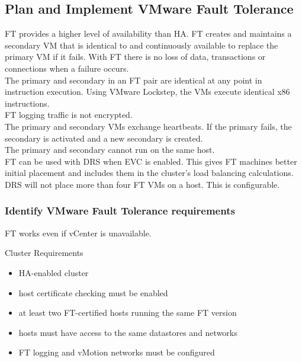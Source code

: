 \subsection{Plan and Implement VMware Fault Tolerance}

FT provides a higher level of availability than HA. FT creates and maintains
a secondary VM that is identical to and continuously available to replace
the primary VM if it fails. With FT there is no loss of data, transactions or
connections when a failure occurs.\\

The primary and secondary in an FT pair are identical at any point in
instruction execution. Using VMware Lockstep, the VMs execute identical x86
instructions.\\

FT logging traffic is not encrypted.\\

The primary and secondary VMs exchange heartbeats. If the primary fails,
the secondary is activated and a new secondary is created.\\

The primary and secondary cannot run on the same host.\\

FT can be used with DRS when EVC is enabled. This gives FT machines better
initial placement and includes them in the cluster's load balancing
calculations.\\

DRS will not place more than four FT VMs on a host. This is configurable.\\

\subsubsection{Identify VMware Fault Tolerance requirements}

FT works even if vCenter is unavailable.

Cluster Requirements

\begin{itemize}
\item HA-enabled cluster
\item host certificate checking must be enabled
\item at least two FT-certified hosts running the same FT version
\item hosts must have access to the same datastores and networks
\item FT logging and vMotion networks must be configured
\end{itemize}

